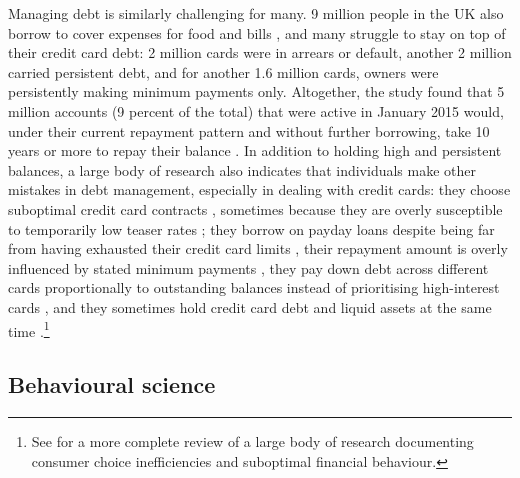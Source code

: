 Managing debt is similarly challenging for many. 9 million people in the UK
also borrow to cover expenses for food and bills \citep{mps2018building}, and
many struggle to stay on top of their credit card debt: 2 million cards were in
arrears or default, another 2 million carried persistent debt, and for another
1.6 million cards, owners were persistently making minimum payments only.
Altogether, the study found that 5 million accounts (9 percent of the total)
that were active in January 2015 would, under their current repayment pattern
and without further borrowing, take 10 years or more to repay their balance
\citep{fca2016credit}. In addition to holding high and persistent balances, a
large body of research also indicates that individuals make other mistakes in
debt management, especially in dealing with credit cards: they choose
suboptimal credit card contracts \citep{agarwal2015consumers}, sometimes
because they are overly susceptible to temporarily low teaser rates
\citep{shui2004time, ausubel1991failure}; they borrow on payday loans despite
being far from having exhausted their credit card limits
\citep{agarwal2009payday}, their repayment amount is overly influenced by
stated minimum payments \citep{sakaguchi2022default}, they pay down debt across
different cards proportionally to outstanding balances instead of prioritising
high-interest cards \citep{gathergood2019individuals}, and they sometimes hold
credit card debt and liquid assets at the same time \citep{gross2002liquidity,
    gathergood2020co}.\footnote{See \citet{agarwal2017shapes} for a more
    complete review of a large body of research documenting consumer choice
inefficiencies and suboptimal financial behaviour.} 


\subsection{Behavioural science}%
\label{sub:role_of_behavioural_science}

